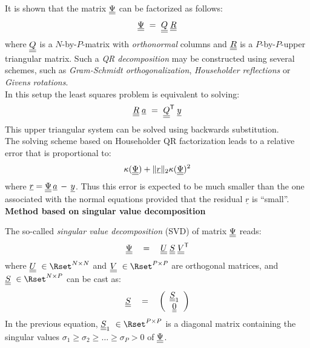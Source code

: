 {  It is shown that the matrix $\underline{\underline{\Psi}}$ can be factorized as follows:
  \begin{align*}
    \underline{\underline{\Psi}} \, \, = \, \, \underline{\underline{Q}} \; \underline{\underline{R}}
  \end{align*}
  where $\underline{\underline{Q}}$ is a $N$-by-$P$-matrix with \emph{orthonormal} columns and $\underline{\underline{R}}$ is a $P$-by-$P$-upper triangular matrix. Such a \emph{QR decomposition} may be constructed using several schemes, such as \emph{Gram-Schmidt orthogonalization}, \emph{Householder reflections} or \emph{Givens rotations}. \\

  In this setup the least squares problem is equivalent to solving:
  \begin{align*}
    \underline{\underline{R}} \; \underline{a} \, \, = \, \, \underline{\underline{Q}}^{\mbox{\scriptsize \textsf{T}}} \; \underline{y}
  \end{align*}
  This upper triangular system can be solved using backwards substitution. \\

  The solving scheme based on Householder QR factorization leads to a relative error that is proportional to:
  \begin{align*}
    \kappa(\underline{\underline{\Psi}}) + \|\underline{r}\|_2 \kappa(\underline{\underline{\Psi}})^2
  \end{align*}
  where $\underline{r} = \underline{\underline{\Psi}} \, \underline{a} \, - \, \underline{y}$.  Thus this error is expected to be much smaller than the one associated with the normal equations provided that the residual $\underline{r}$ is ``small''. \\

  \textbf{Method based on singular value decomposition} \vspace{2mm}

  The so-called \emph{singular value decomposition} (SVD) of matrix $\underline{\underline{\Psi}}$ reads:
  \begin{align*}
    \underline{\underline{\Psi}} \quad = \quad \underline{\underline{U}} \; \underline{\underline{S}} \; \underline{\underline{V}}^{\mbox{\scriptsize \textsf{T}}}
  \end{align*}
  where $\matr{U}~\in \Rset^{N \times N}$ and $\matr{V}~\in \Rset^{P \times P}$ are orthogonal matrices, and $\matr{S}~\in \Rset^{N \times P}$ can be cast as:
  \begin{align*}
    \underline{\underline{S}} \quad = \quad \left(
    \begin{array}{c}
      \underline{\underline{S}}_1 \\
      \underline{\underline{0}} \\
    \end{array}
    \right)
  \end{align*}
  In the previous equation, $\matr{S}_1~\in \Rset^{P \times P}$ is a diagonal matrix containing the singular values $\sigma_1 \geq \sigma_2 \geq \dots \geq \sigma_P > 0$ of $\underline{\underline{\Psi}}$. \\

}
